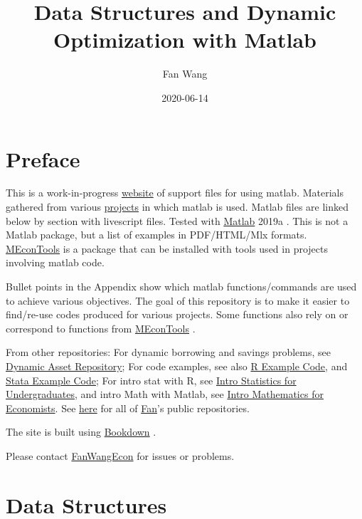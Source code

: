 \documentclass[
]{book}
\title{Data Structures and Dynamic Optimization with Matlab}
\author{Fan Wang}
\date{2020-06-14}
\begin{document}
\maketitle

{
\hypersetup{linkcolor=}
\setcounter{tocdepth}{1}
\tableofcontents
}
\hypertarget{preface}{%
\chapter*{Preface}\label{preface}}

This is a work-in-progress \href{https://fanwangecon.github.io/M4Econ/}{website} of support files for using matlab. Materials gathered from various \href{https://fanwangecon.github.io/research}{projects} in which matlab is used. Matlab files are linked below by section with livescript files. Tested with \href{https://www.mathworks.com/products/matlab.html}{Matlab} 2019a \citep{matlab}. This is not a Matlab package, but a list of examples in PDF/HTML/Mlx formats. \href{https://github.com/FanWangEcon/MEconTools}{MEconTools} is a package that can be installed with tools used in projects involving matlab code.

Bullet points in the Appendix show which matlab functions/commands are used to achieve various objectives. The goal of this repository is to make it easier to find/re-use codes produced for various projects. Some functions also rely on or correspond to functions from \href{https://github.com/FanWangEcon/MEconTools}{MEconTools} \citep{M-MEconTools}.

From other repositories: For dynamic borrowing and savings problems, see \href{https://fanwangecon.github.io/CodeDynaAsset/}{Dynamic Asset Repository}; For code examples, see also \href{https://fanwangecon.github.io/R4Econ/}{R Example Code}, and \href{https://fanwangecon.github.io/Stata4Econ/}{Stata Example Code}; For intro stat with R, see \href{https://fanwangecon.github.io/Stat4Econ/}{Intro Statistics for Undergraduates}, and intro Math with Matlab, see \href{https://fanwangecon.github.io/Math4Econ/}{Intro Mathematics for Economists}. See \href{https://github.com/FanWangEcon}{here} for all of \href{https://fanwangecon.github.io/}{Fan}'s public repositories.

The site is built using \href{https://bookdown.org/}{Bookdown} \citep{R-bookdown}.

Please contact \href{https://fanwangecon.github.io/}{FanWangEcon} for issues or problems.

\hypertarget{data-structures}{%
\chapter{Data Structures}\label{data-structures}}
\end{document}
